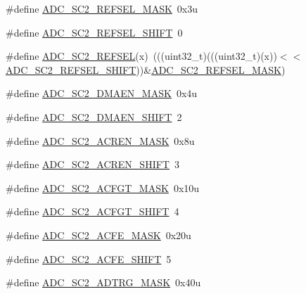 \begin{DoxyCompactItemize}
\item 
\#define \hyperlink{group___a_d_c___register___masks_gaa821d1e2e4575c757e9446da61b2230a}{A\+D\+C\+\_\+\+S\+C2\+\_\+\+R\+E\+F\+S\+E\+L\+\_\+\+M\+A\+SK}~0x3u
\item 
\#define \hyperlink{group___a_d_c___register___masks_gaab9b293eb54de2d9d246766002e44556}{A\+D\+C\+\_\+\+S\+C2\+\_\+\+R\+E\+F\+S\+E\+L\+\_\+\+S\+H\+I\+FT}~0
\item 
\#define \hyperlink{group___a_d_c___register___masks_gacac3b41d5c2bb74a8c614f200f0c0a36}{A\+D\+C\+\_\+\+S\+C2\+\_\+\+R\+E\+F\+S\+EL}(x)~(((uint32\+\_\+t)(((uint32\+\_\+t)(x))$<$$<$\hyperlink{group___a_d_c___register___masks_gaab9b293eb54de2d9d246766002e44556}{A\+D\+C\+\_\+\+S\+C2\+\_\+\+R\+E\+F\+S\+E\+L\+\_\+\+S\+H\+I\+FT}))\&\hyperlink{group___a_d_c___register___masks_gaa821d1e2e4575c757e9446da61b2230a}{A\+D\+C\+\_\+\+S\+C2\+\_\+\+R\+E\+F\+S\+E\+L\+\_\+\+M\+A\+SK})
\item 
\#define \hyperlink{group___a_d_c___register___masks_ga50fc5fed4844c3ceb8da9b595029da11}{A\+D\+C\+\_\+\+S\+C2\+\_\+\+D\+M\+A\+E\+N\+\_\+\+M\+A\+SK}~0x4u
\item 
\#define \hyperlink{group___a_d_c___register___masks_ga5554f538c0c6d7b3e2dfa502fdfed488}{A\+D\+C\+\_\+\+S\+C2\+\_\+\+D\+M\+A\+E\+N\+\_\+\+S\+H\+I\+FT}~2
\item 
\#define \hyperlink{group___a_d_c___register___masks_ga25f7f0c6a6513cbfbd4684513b373f9c}{A\+D\+C\+\_\+\+S\+C2\+\_\+\+A\+C\+R\+E\+N\+\_\+\+M\+A\+SK}~0x8u
\item 
\#define \hyperlink{group___a_d_c___register___masks_ga34954b7e5cb86e290b281e2f97b63187}{A\+D\+C\+\_\+\+S\+C2\+\_\+\+A\+C\+R\+E\+N\+\_\+\+S\+H\+I\+FT}~3
\item 
\#define \hyperlink{group___a_d_c___register___masks_gaf61a6fdf74bec8c24415e590dc98b572}{A\+D\+C\+\_\+\+S\+C2\+\_\+\+A\+C\+F\+G\+T\+\_\+\+M\+A\+SK}~0x10u
\item 
\#define \hyperlink{group___a_d_c___register___masks_gaa27da559ff9959f248db75fbb95dae6b}{A\+D\+C\+\_\+\+S\+C2\+\_\+\+A\+C\+F\+G\+T\+\_\+\+S\+H\+I\+FT}~4
\item 
\#define \hyperlink{group___a_d_c___register___masks_gace8c45960f30bb960fd14d268b7eafde}{A\+D\+C\+\_\+\+S\+C2\+\_\+\+A\+C\+F\+E\+\_\+\+M\+A\+SK}~0x20u
\item 
\#define \hyperlink{group___a_d_c___register___masks_ga195dec335492d561b06a4cc443bae019}{A\+D\+C\+\_\+\+S\+C2\+\_\+\+A\+C\+F\+E\+\_\+\+S\+H\+I\+FT}~5
\item 
\#define \hyperlink{group___a_d_c___register___masks_ga25669c020c8970b55cd619752bdc84d2}{A\+D\+C\+\_\+\+S\+C2\+\_\+\+A\+D\+T\+R\+G\+\_\+\+M\+A\+SK}~0x40u
$$
\end{DoxyCompactItemize}
